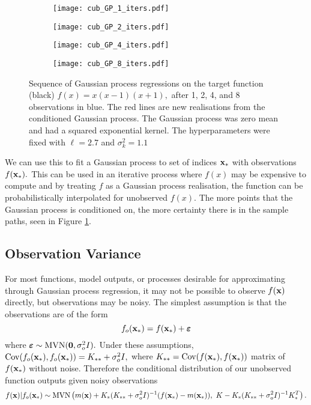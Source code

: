 \begin{figure}[htbp]
    \centering
    \begin{subfigure}[b]{0.5\textwidth}
        \centering
        \texttt{[image: cub\_GP\_1\_iters.pdf]}
    \end{subfigure}%
    \hfill%
    \begin{subfigure}[b]{0.5\textwidth}
        \centering
        \texttt{[image: cub\_GP\_2\_iters.pdf]}
    \end{subfigure}
    \begin{subfigure}[b]{0.5\textwidth}
        \centering
        \texttt{[image: cub\_GP\_4\_iters.pdf]}
    \end{subfigure}%
    \hfill%
    \begin{subfigure}[b]{0.5\textwidth}
        \centering
        \texttt{[image: cub\_GP\_8\_iters.pdf]}
    \end{subfigure}%
    \caption{
        Sequence of Gaussian process regressions on the target function
        (black) $f(x) = x(x-1)(x+1),$ after 1, 2, 4, and 8 observations in
        blue. The red lines are new realisations from the conditioned Gaussian
        process. The Gaussian process was zero mean and had a squared
        exponential kernel. The hyperparameters were fixed with $\ell = 2.7$
        and $\sigma^2_k = 1.1$
    }
    \label{fig:no_var_cub_reg}
\end{figure}

We can use this to fit a Gaussian process to set of indices $\mathbf{x}_*$ with
observations $f(\mathbf{x}_*).$
This can be used in an iterative process where $f(x)$
may be expensive to compute and by treating $f$ as a Gaussian process 
realisation, the function can be probabilistically interpolated for unobserved
$f(x).$ The
more points that the Gaussian process is conditioned on, the more certainty
there is in the sample paths, seen in Figure \ref{fig:no_var_cub_reg}.

\subsection*{Observation Variance}

For most functions, model outputs, or processes desirable for
approximating through Gaussian process regression, it may not be possible to
observe $f(\mathbf{x})$ directly, but observations may be noisy.
The simplest assumption is that the
observations are of the form
$$
    f_o(\mathbf{x}_*) = f(\mathbf{x}_*) + \bm{\varepsilon}
$$
where $\bm{\varepsilon} \sim \operatorname{MVN}(\mathbf{0}, \sigma^2_o I).$
Under these assumptions,
$\mathrm{Cov}(f_o(\mathbf{x}_*), f_o(\mathbf{x}_*)) = K_{**} + \sigma^2_o I,$
where $K_{**} = \mathrm{Cov}(f(\mathbf{x}_*), f(\mathbf{x}_*))$
matrix of $f(\mathbf{x}_*)$ without noise. Therefore the conditional
distribution of our unobserved function outputs given noisy observations
$$
    f(\mathbf{x}) | f_o(\mathbf{x}_*)
    \sim \operatorname{MVN}\left(
    m(\mathbf{x}) + K_{*}
    (K_{**} + \sigma^2_o I)^{-1}
    (f(\mathbf{x}_*) - m(\mathbf{x}_*)), \,\,
    K - K_{*}(K_{**} + \sigma^2_o I)^{-1}K_{*}^T
    \right).
$$


